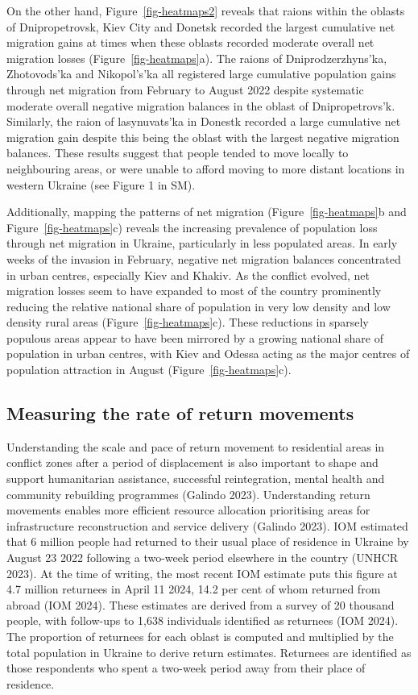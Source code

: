 \documentclass[
  sn-nature,
  11pt,
]{sn-jnl}
\begin{document}
On the other hand, Figure~\ref{fig-heatmaps2} reveals that raions within
the oblasts of Dnipropetrovsk, Kiev City and Donetsk recorded the
largest cumulative net migration gains at times when these oblasts
recorded moderate overall net migration losses
(Figure~\ref{fig-heatmaps}a). The raions of Dniprodzerzhyns'ka,
Zhotovods'ka and Nikopol's'ka all registered large cumulative population
gains through net migration from February to August 2022 despite
systematic moderate overall negative migration balances in the oblast of
Dnipropetrovs'k. Similarly, the raion of lasynuvats'ka in Donestk
recorded a large cumulative net migration gain despite this being the
oblast with the largest negative migration balances. These results
suggest that people tended to move locally to neighbouring areas, or
were unable to afford moving to more distant locations in western
Ukraine (see Figure 1 in SM).

Additionally, mapping the patterns of net migration
(Figure~\ref{fig-heatmaps}b and Figure~\ref{fig-heatmaps}c) reveals the
increasing prevalence of population loss through net migration in
Ukraine, particularly in less populated areas. In early weeks of the
invasion in February, negative net migration balances concentrated in
urban centres, especially Kiev and Khakiv. As the conflict evolved, net
migration losses seem to have expanded to most of the country
prominently reducing the relative national share of population in very
low density and low density rural areas (Figure~\ref{fig-heatmaps}c).
These reductions in sparsely populous areas appear to have been mirrored
by a growing national share of population in urban centres, with Kiev
and Odessa acting as the major centres of population attraction in
August (Figure~\ref{fig-heatmaps}c).

\subsection{Measuring the rate of return movements}\label{sec-return}

Understanding the scale and pace of return movement to residential areas
in conflict zones after a period of displacement is also important to
shape and support humanitarian assistance, successful reintegration,
mental health and community rebuilding programmes (Galindo 2023).
Understanding return movements enables more efficient resource
allocation prioritising areas for infrastructure reconstruction and
service delivery (Galindo 2023). IOM estimated that 6 million people had
returned to their usual place of residence in Ukraine by August 23 2022
following a two-week period elsewhere in the country (UNHCR 2023). At
the time of writing, the most recent IOM estimate puts this figure at
4.7 million returnees in April 11 2024, 14.2 per cent of whom returned
from abroad (IOM 2024). These estimates are derived from a survey of 20
thousand people, with follow-ups to 1,638 individuals identified as
returnees (IOM 2024). The proportion of returnees for each oblast is
computed and multiplied by the total population in Ukraine to derive
return estimates. Returnees are identified as those respondents who
spent a two-week period away from their place of residence.
\end{document}
